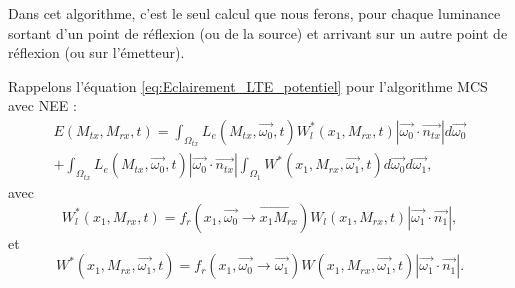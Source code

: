 Dans cet algorithme, c'est le seul calcul que nous ferons, pour chaque luminance sortant d'un point de réflexion (ou de la source) et arrivant sur un autre point de réflexion (ou sur l'émetteur).\par
Rappelons l'équation \ref{eq:Eclairement_LTE_potentiel} pour l'algorithme MCS avec NEE :
\large \begin{multline*}
    E(M_{tx}, M_{rx}, t) =
        \int_{\Omega_{tx}}
            L_e(M_{tx}, \overrightarrow{\omega_0}, t)
            W_l^*(x_1, M_{rx}, t)
            | \overrightarrow{\omega_0} \cdot \overrightarrow{n_{tx}} |
            d\overrightarrow{\omega_0}
        \\ +
        \int_{\Omega_{tx}}
            L_e(M_{tx}, \overrightarrow{\omega_0}, t)
            | \overrightarrow{\omega_0} \cdot \overrightarrow{n_{tx}} |
            \int_{\Omega_1}
                W^*(x_1, M_{rx}, \overrightarrow{\omega_1}, t)
            d\overrightarrow{\omega_0}
        d\overrightarrow{\omega_1}
,\end{multline*} \normalsize
avec
\large \begin{equation*}
    W_l^*(x_1, M_{rx}, t) =
        f_r(x_1, \overrightarrow{\omega_0} \longrightarrow \overrightarrow{x_1 M_{rx}})
        W_l(x_1, M_{rx}, t)
        | \overrightarrow{\omega_1} \cdot \overrightarrow{n_1} |
,\end{equation*} \normalsize
et
\large \begin{equation*}
    W^*(x_1, M_{rx}, \overrightarrow{\omega_1}, t) = 
        f_r(x_1, \overrightarrow{\omega_0} \longrightarrow \overrightarrow{\omega_1})
        W(x_1, M_{rx}, \overrightarrow{\omega_1}, t)
        | \overrightarrow{\omega_1} \cdot \overrightarrow{n_1} |
.\end{equation*} \normalsize \newline \par

